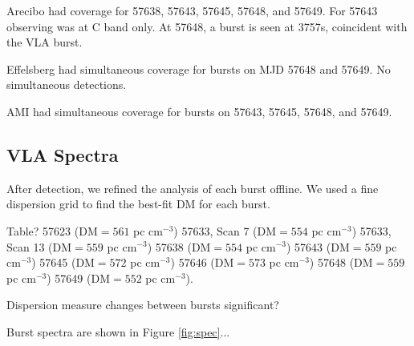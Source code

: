 \documentclass{emulateapj}
\begin{document}
Arecibo had coverage for 57638, 57643, 57645, 57648, and 57649. For 57643 observing was at C band only. At 57648, a burst is seen at 3757s, coincident with the VLA burst.

Effelsberg had simultaneous coverage for bursts on MJD 57648 and 57649. No simultaneous detections.

AMI had simultaneous coverage for bursts on 57643, 57645, 57648, and 57649.


\subsection{VLA Spectra}
After detection, we refined the analysis of each burst offline. We used a fine dispersion grid to find the best-fit DM for each burst.

Table?
57623 (DM$=561$ pc cm$^{-3}$)
57633, Scan 7 (DM$=554$ pc cm$^{-3}$)
57633, Scan 13 (DM$=559$ pc cm$^{-3}$)
57638 (DM$=554$ pc cm$^{-3}$)
57643 (DM$=559$ pc cm$^{-3}$)
57645 (DM$=572$ pc cm$^{-3}$)
57646 (DM$=573$ pc cm$^{-3}$)
57648 (DM$=559$ pc cm$^{-3}$)
57649 (DM$=552$ pc cm$^{-3}$).

Dispersion measure changes between bursts significant?

Burst spectra are shown in Figure \ref{fig:spec}...
\end{document}
